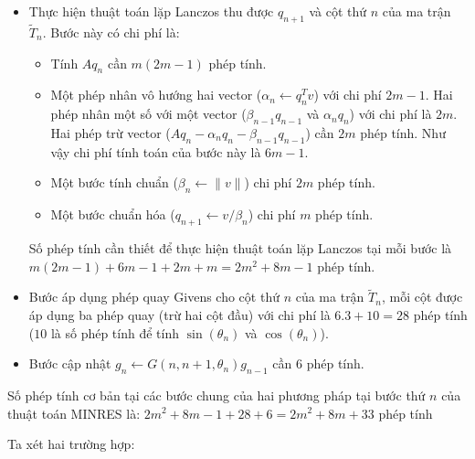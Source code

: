 \documentclass[14pt, a4paper]{article}
\numberwithin{equation}{section}
\numberwithin{algorithm}{section}
\numberwithin{figure}{section}
\numberwithin{dl}{section}
\numberwithin{md}{section}
\numberwithin{bd}{section}
\numberwithin{dn}{section}
\begin{document}
\begin{itemize}
    \item Thực hiện thuật toán lặp Lanczos thu được $q_{n+1}$ và cột thứ $n$ của ma trận $\widetilde{T}_n$. Bước này có chi phí là:
    \begin{itemize}
        \item Tính $Aq_n$ cần $m(2m-1)$ phép tính.
        \item Một phép nhân vô hướng hai vector ($\alpha_n \leftarrow q_n^Tv$) với chi phí $2m-1$. Hai phép nhân một số với một vector ($\beta_{n-1}q_{n-1}$ và $\alpha_n q_n$) với chi phí là $2m$. Hai phép trừ vector ($Aq_n - \alpha_n q_n - \beta_{n-1} q_{n-1}$) cần $2m$ phép tính. Như vậy chi phí tính toán của bước này là $6m-1$.
        \item Một bước tính chuẩn ($\beta_n \leftarrow \lVert v \rVert$) chi phí $2m$ phép tính.
        \item Một bước chuẩn hóa ($q_{n+1} \leftarrow v/\beta_n$) chi phí $m$ phép tính.
    \end{itemize}
    Số phép tính cần thiết để thực hiện thuật toán lặp Lanczos tại mỗi bước là $m(2m-1) + 6m-1 + 2m + m=2m^2+8m-1$ phép tính.
    \item Bước áp dụng phép quay Givens cho cột thứ $n$ của ma trận $\widetilde{T}_n$, mỗi cột được áp dụng ba phép quay (trừ hai cột đầu) với chi phí là $6.3+10=28$ phép tính ($10$ là số phép tính để tính $\sin(\theta_n)$ và $\cos(\theta_n)$).
    \item Bước cập nhật $g_n \leftarrow G(n, n+1, \theta_n)g_{n-1}$ cần 6 phép tính.
\end{itemize}
Số phép tính cơ bản tại các bước chung của hai phương pháp tại bước thứ $n$ của thuật toán MINRES là: $2m^2 + 8m-1 + 28 + 6=2m^2 + 8m + 33$ phép tính

Ta xét hai trường hợp:
\end{document}
